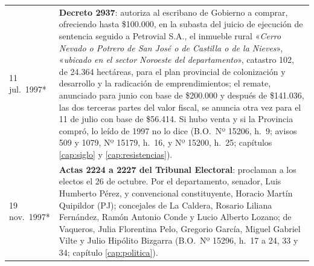 \begin{longtable}{@{}p{2.7cm}p{10.3cm}@{}}
11 jul.\ 1997* & \textbf{Decreto 2937}: autoriza al escribano de Gobierno a comprar, ofreciendo hasta \$100.000, en la subasta del juicio de ejecución de sentencia seguido a Petrovial S.A., el inmueble rural «\textit{Cerro Nevado o Potrero de San José o de Castilla o de la Nieves}», «\textit{ubicado en el sector Noroeste del departamento}», catastro 102, de 24.364 hectáreas, para el plan provincial de colonización y desarrollo y la radicación de emprendimientos; el remate, anunciado para junio con base de \$200.000 y después de \$141.036, las dos terceras partes del valor fiscal, se anuncia otra vez para el 11 de julio con base de \$56.414. Si hubo venta y si la Provincia compró, lo leído de 1997 no lo dice (B.O.\ Nº 15206, h.\ 9; avisos 509 y 1079, Nº 15179, h.\ 16, y Nº 15200, h.\ 25; capítulos \ref{cap:siglo} y \ref{cap:resistencias}). \\
19 nov.\ 1997* & \textbf{Actas 2224 a 2227 del Tribunal Electoral}: proclaman a los electos el 26 de octubre. Por el departamento, senador, Luis Humberto Pérez, y convencional constituyente, Horacio Martín Quipildor (PJ); concejales de La Caldera, Rosario Liliana Fernández, Ramón Antonio Conde y Lucio Alberto Lozano; de Vaqueros, Julia Florentina Pelo, Gregorio García, Miguel Gabriel Vilte y Julio Hipólito Bizgarra (B.O.\ Nº 15296, h.\ 17 a 24, 33 y 34; capítulo \ref{cap:politica}). \\

\end{longtable}
